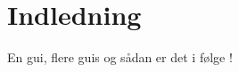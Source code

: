 \chapter{Indledning}

En \gls{gui}, flere \glspl{gui} og sådan er det i følge \cite{fysikbog}!

\lipsum[5-10]